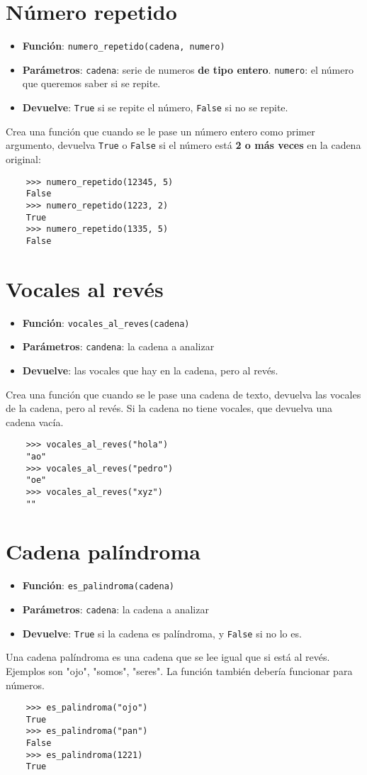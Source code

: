 \documentclass{article}
\begin{document}
\section{Número repetido}
\begin{itemize}
    \item \textbf{Función}: \verb|numero_repetido(cadena, numero)| 
    \item \textbf{Parámetros}: \verb|cadena|: serie de numeros \textbf{de tipo entero}.
    \verb|numero|: el número que queremos saber si se repite.
    \item \textbf{Devuelve}: \verb|True| si se repite el número, \verb|False| si no se repite.
\end{itemize}
Crea una función que cuando se le pase un número entero como primer argumento, devuelva \verb|True|
o \verb|False| si el número está \textbf{2 o más veces} en la cadena original:
\begin{verbatim}
    >>> numero_repetido(12345, 5)
    False
    >>> numero_repetido(1223, 2)
    True
    >>> numero_repetido(1335, 5)
    False
\end{verbatim}
\section{Vocales al revés}
\begin{itemize}
    \item \textbf{Función}: \verb|vocales_al_reves(cadena)|
    \item \textbf{Parámetros}: \verb|candena|: la cadena a analizar
    \item \textbf{Devuelve}: las vocales que hay en la cadena, pero al revés.
\end{itemize}
Crea una función que cuando se le pase una cadena de texto, devuelva las vocales de la cadena, pero al revés. Si
la cadena no tiene vocales, que devuelva una cadena vacía.
\begin{verbatim}
    >>> vocales_al_reves("hola")
    "ao"
    >>> vocales_al_reves("pedro")
    "oe"
    >>> vocales_al_reves("xyz")
    ""
\end{verbatim}
\pagebreak
\section{Cadena palíndroma}
\begin{itemize}
    \item \textbf{Función}: \verb|es_palindroma(cadena)|
    \item \textbf{Parámetros}: \verb|cadena|: la cadena a analizar
    \item \textbf{Devuelve}: \verb|True| si la cadena es palíndroma, y \verb|False| si no lo es.
\end{itemize}
Una cadena palíndroma es una cadena que se lee igual que si está al revés. Ejemplos son "ojo", "somos", "seres".
La función también debería funcionar para números.
\begin{verbatim}
    >>> es_palindroma("ojo")
    True
    >>> es_palindroma("pan")
    False
    >>> es_palindroma(1221)
    True
\end{verbatim}
\end{document}
